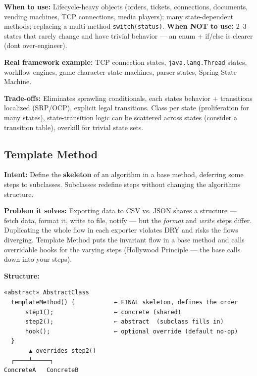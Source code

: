 \documentclass[11pt]{article}
\begin{document}
\textbf{When to use:} Lifecycle-heavy objects (orders, tickets, connections, documents, vending machines, TCP connections, media players); many state-dependent methods; replacing a multi-method \texttt{switch(status)}. \textbf{When NOT to use:} 2--3 states that rarely change and have trivial behavior --- an enum + if/else is clearer (don\textquotesingle t over-engineer).

\textbf{Real framework example:} TCP connection states, \texttt{java.lang.Thread} states, workflow engines, game character state machines, parser states, Spring State Machine.

\textbf{Trade-offs:} Eliminates sprawling conditionals, each state\textquotesingle s behavior + transitions localized (SRP/OCP), explicit legal transitions. Class per state (proliferation for many states), state-transition logic can be scattered across states (consider a transition table), overkill for trivial state sets.

\subsection{Template Method}\label{template-method}

\textbf{Intent:} Define the \textbf{skeleton} of an algorithm in a base method, deferring some steps to subclasses. Subclasses redefine steps without changing the algorithm\textquotesingle s structure.

\textbf{Problem it solves:} Exporting data to CSV vs. JSON shares a structure --- fetch data, format it, write to file, notify --- but the \emph{format} and \emph{write} steps differ. Duplicating the whole flow in each exporter violates DRY and risks the flows diverging. Template Method puts the invariant flow in a base method and calls overridable hooks for the varying steps (Hollywood Principle --- the base calls down into your steps).

\textbf{Structure:}

\setcodelang{}

\begin{verbatim}
«abstract» AbstractClass
  templateMethod() {           ← FINAL skeleton, defines the order
      step1();                 ← concrete (shared)
      step2();                 ← abstract  (subclass fills in)
      hook();                  ← optional override (default no-op)
  }
       ▲ overrides step2()
  ┌────┴─────┐
ConcreteA   ConcreteB
\end{verbatim}

\end{document}
